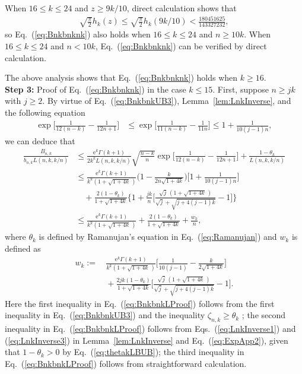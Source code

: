 \documentclass[aop]{imsart}
\theoremstyle{plain}
\theoremstyle{remark}
\newcommand{\rme}{\mathrm{e}}
\newcommand{\1}{\operatorname{\uppercase\expandafter{\romannumeral1}}}
\newcommand{\2}{\operatorname{\uppercase\expandafter{\romannumeral2}}}
\newcommand{\3}{\operatorname{\uppercase\expandafter{\romannumeral3}}}
\newcommand{\4}{\operatorname{\uppercase\expandafter{\romannumeral4}}}
\newcommand{\5}{\operatorname{\uppercase\expandafter{\romannumeral5}}}
\newcommand{\6}{\operatorname{\uppercase\expandafter{\romannumeral6}}}
\newcommand{\7}{\operatorname{\uppercase\expandafter{\romannumeral7}}}
\newcommand{\8}{\operatorname{\uppercase\expandafter{\romannumeral8}}}
\newcommand{\9}{\operatorname{\uppercase\expandafter{\romannumeral9}}}
\newcommand{\eref}[1]{Eq.~\textup{(\ref{#1})}}
\newcommand{\eqsref}[2]{Eqs.~(\ref{#1}) and (\ref{#2})}
\newcommand{\lref}[1]{Lemma~\ref{#1}}
\begin{document}
\begin{appendix}
	When $16\leq k\leq 24$ and $z\geq 9k/10$,
	direct calculation shows that 
	\begin{align}
	\sqrt{\frac{\pi}{2}}h_k(z)\leq \sqrt{\frac{\pi}{2}} h_k(9k/10)< \frac{180451625}{143327232},
	\end{align}
	so  \eref{eq:Bnkbnknk} also holds when $16\leq k\leq 24$ and $n\geq 10k$. When $16\leq k\leq 24$ and $n< 10k$,  \eref{eq:Bnkbnknk} can be verified by direct calculation. 
	
The above analysis shows that  \eref{eq:Bnkbnknk} holds when $k\geq 16$. \\
	
\textbf{Step 3:} Proof of \eref{eq:Bnkbnknk} in the case $k\leq 15$. First, suppose $n\geq jk$ with $j\geq 2$.  By virtue of  \eref{eq:BnkbnkUB3}, \lref{lem:LnkInverse}, and the following equation
	\begin{align}\label{eq:ExpApp2}
	\exp\biggl[\frac{1}{12(n-k)}-\frac{1}{12n+1}\biggr]&\leq \exp\biggl[\frac{1}{11(n-k)}-\frac{1}{11n}\biggr]\leq  1+\frac{1}{10(j-1)n},
	\end{align}
	we can deduce that
	\begin{align}\label{eq:BnkbnkLProof}
	\frac{B_{n,k}}{b_{n,k}L(n,k,k/n)}&\leq \frac{\rme^k \Gamma(k+1)}{2k^k L(n,k,k/n)}\sqrt{\frac{n-k}{n}}\exp\biggl[\frac{1}{12(n-k)}-\frac{1}{12n+1}\biggr]+\frac{1-\theta_k}{L(n,k,k/n)}
	\\&\leq \frac{\rme^k \Gamma(k+1)}{k^k (1+\sqrt{1+4k}\,)}\biggl(1-\frac{k}{2n\sqrt{1+4k}}\biggr)\biggl[1+\frac{1}{10(j-1)n}\biggr]\nonumber\\
	&\quad +\frac{2(1-\theta_k)}{1+\sqrt{1+4k}}\biggl\{1+\frac{jk}{n}\biggl[\frac{\sqrt{j}\,(1+\sqrt{1+4k}\,)}{\sqrt{j}+\sqrt{j+4(j-1)k}}-1\biggr]\biggr\}\nonumber \\
	&\leq  \frac{\rme^k \Gamma(k+1)}{k^k (1+\sqrt{1+4k}\,)}+\frac{2(1-\theta_k)}{1+\sqrt{1+4k}}
	+\frac{w_k}{n},\nonumber
	\end{align}
	where  $\theta_k$ is defined by Ramanujan's equation in \eref{eq:Ramanujan}  and $w_k$ is defined as 
	\begin{align}
	w_k:=&\,\frac{\rme^k \Gamma(k+1)}{k^k (1+\sqrt{1+4k}\,)}\biggl[\frac{1}{10(j-1)}-\frac{k}{2\sqrt{1+4k}}\biggr] \\
	&\, +\frac{2jk(1-\theta_k)}{1+\sqrt{1+4k}}\biggl[\frac{\sqrt{j}\,(1+\sqrt{1+4k}\,)}{\sqrt{j}+\sqrt{j+4(j-1)k}}-1\biggr].\nonumber
	\end{align}
Here the first inequality in \eref{eq:BnkbnkLProof} follows from the first inequality in \eref{eq:BnkbnkUB3} and the inequality  $\zeta_{n,k}\geq \theta_k $  \cite{JogdS68}; the second inequality  in \eref{eq:BnkbnkLProof}  follows from \eqsref{eq:LnkInverse1}{eq:LnkInverse3}	in \lref{lem:LnkInverse} and \eref{eq:ExpApp2},
given that $1-\theta_k>0$ by \eref{eq:thetakLBUB}; the third inequality in \eref{eq:BnkbnkLProof}  follows from straightforward calculation. 
	

\end{appendix}
\end{document}
